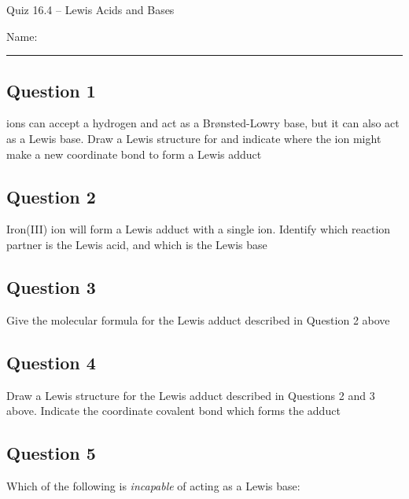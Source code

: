 \documentclass[11pt, letterpaper]{memoir}
\begin{document}
	\begin{center}
		{\large	Quiz 16.4 -- Lewis Acids and Bases}
	\end{center}
	{\large Name: \rule[-1mm]{4in}{.1pt} 
	
	\subsection*{Question 1}
	 ions can accept a hydrogen and act as a Br\o nsted-Lowry base, but it can also act as a Lewis base. Draw a Lewis structure for 	 and indicate where the ion might make a new coordinate bond to form a Lewis adduct
	
	\vspace{4em}
	\subsection*{Question 2}
	Iron(III) ion will form a Lewis adduct with a single  ion. Identify which reaction partner is the Lewis acid, and which is the Lewis base
	
	\vspace{4em}
	\subsection*{Question 3}
	Give the molecular formula for the Lewis adduct described in Question 2 above
	
	
	\vspace{2em}
	\subsection*{Question 4}
	Draw a Lewis structure for the Lewis adduct described in Questions 2 and 3 above. Indicate the coordinate covalent bond which forms the adduct

	\vspace{4em}
	\subsection*{Question 5}
	Which of the following is \emph{incapable} of acting as a Lewis base:
	
	{\large {} \hspace{4em}  \hspace{4em}  \hspace{4em}  \hspace{4em} }
	
	\vspace{2em}
}
\end{document}
